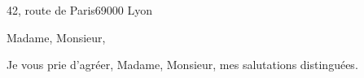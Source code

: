 \documentclass[11pt,french,signature,boldnames]{epistola}
\begin{document}
\address{John Doe}{42, route de Paris}{69000 Lyon}

\location{}
\date{\today}


\opening{Madame, Monsieur,}

\lipsum[1-2]

\closing{Je vous prie d'agréer, Madame, Monsieur, mes salutations distinguées.}
\end{document}
